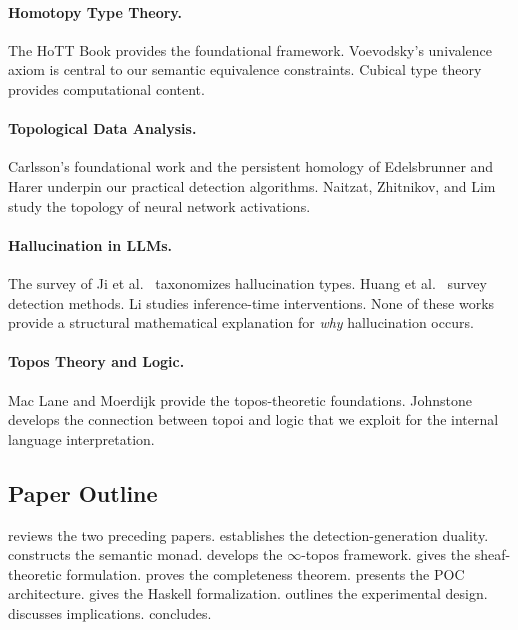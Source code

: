 \documentclass[11pt,a4paper]{article}
\theoremstyle{plain}
\theoremstyle{definition}
\theoremstyle{remark}
\begin{document}
\paragraph{Homotopy Type Theory.} The HoTT Book \cite{hottbook} provides the foundational framework. Voevodsky's univalence axiom \cite{voevodsky2010univalent} is central to our semantic equivalence constraints. Cubical type theory \cite{cohen2018cubical} provides computational content.

\paragraph{Topological Data Analysis.} Carlsson's foundational work \cite{carlsson2009topology} and the persistent homology of Edelsbrunner and Harer \cite{edelsbrunner2010computational} underpin our practical detection algorithms. Naitzat, Zhitnikov, and Lim \cite{naitzat2020topology} study the topology of neural network activations.

\paragraph{Hallucination in LLMs.} The survey of Ji et al.\ \cite{ji2023survey} taxonomizes hallucination types. Huang et al.\ \cite{huang2023survey} survey detection methods. Li \cite{li2025} studies inference-time interventions. None of these works provide a structural mathematical explanation for \emph{why} hallucination occurs.

\paragraph{Topos Theory and Logic.} Mac Lane and Moerdijk \cite{maclane1994sheaves} provide the topos-theoretic foundations. Johnstone \cite{johnstone2002sketches} develops the connection between topoi and logic that we exploit for the internal language interpretation.

\subsection{Paper Outline}

 reviews the two preceding papers.  establishes the detection-generation duality.  constructs the semantic monad.  develops the $\infty$-topos framework.  gives the sheaf-theoretic formulation.  proves the completeness theorem.  presents the POC architecture.  gives the Haskell formalization.  outlines the experimental design.  discusses implications.  concludes.
\end{document}
